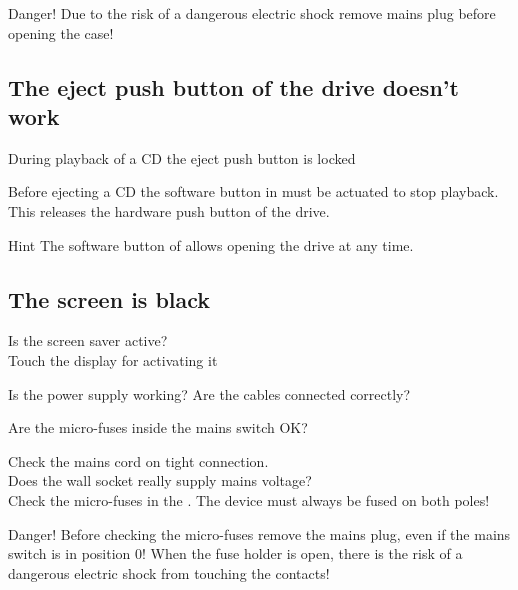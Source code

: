 {\begin{bclogo}[arrondi = 0.2, logo = \bcdanger, ombre = true, epOmbre = 0.25, couleurOmbre = red!75,blur]{Danger!} 
Due to the risk of a dangerous electric shock remove mains plug before 
opening the case!\\
\end{bclogo}


\subsection{The eject push button of the {\CDROM} drive doesn't work}
\begin{compactitem}
\item{During playback of a CD the eject push button is locked} 
\end{compactitem}
Before ejecting a CD the software button  in {\audacious} 
must be actuated to stop playback. This releases the hardware push 
button of the drive. 
\begin{bclogo}[logo = \bclampe, noborder = true]{Hint}
The software button  of {\audacious} allows opening the
{\CDROM} drive at any time.
\end{bclogo}


\subsection{The screen is black}
\begin{compactitem}
\item{Is the screen saver active?\\
      Touch the display for activating it}
\item{Is the power supply working? Are the cables connected correctly?}
\item{Are the micro-fuses inside the mains switch OK?}
\end{compactitem}
Check the mains cord on tight connection.\\
Does the wall socket really supply mains voltage?\\
Check the micro-fuses in the {\Bezeichnung}. The device must always be 
fused on both poles!

{\begin{bclogo}[arrondi = 0.2, logo = \bcdanger, ombre = true, epOmbre = 0.25, couleurOmbre = red!75,blur]{Danger!} 
Before checking the micro-fuses remove the mains plug, even if the mains
switch is in position 0! When the fuse holder is open, there is the risk
of a dangerous electric shock from touching the contacts!
\end{bclogo}

}}
